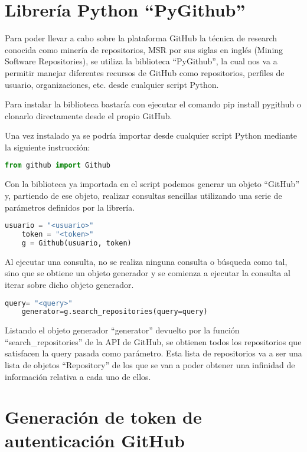 \section{Librería Python ``PyGithub''}

Para poder llevar a cabo sobre la plataforma GitHub la técnica de research conocida como minería de repositorios, MSR por sus siglas en inglés (Mining Software Repositories), se utiliza la biblioteca ``PyGithub'', la cual nos va a permitir manejar diferentes recursos de GitHub como repositorios, perfiles de usuario, organizaciones, etc. desde cualquier script Python.

Para instalar la biblioteca bastaría con ejecutar el comando pip install pygithub o clonarlo directamente desde el propio GitHub.

Una vez instalado ya se podría importar desde cualquier script Python mediante la siguiente instrucción:

\begin{lstlisting}[language=Python]
    from github import Github
\end{lstlisting}

Con la biblioteca ya importada en el script podemos generar un objeto ``GitHub'' y, partiendo de ese objeto, realizar consultas sencillas utilizando una serie de parámetros definidos por la librería.

\begin{lstlisting}[language=Python]
    usuario = "<usuario>" 
    token = "<token>"
    g = Github(usuario, token)
\end{lstlisting}

Al ejecutar una consulta, no se realiza ninguna consulta o búsqueda como tal, sino que se obtiene un objeto generador y se comienza a ejecutar la consulta al iterar sobre dicho objeto generador.

\begin{lstlisting}[language=Python]
    query= "<query>" 
    generator=g.search_repositories(query=query)
\end{lstlisting}



Listando el objeto generador ``generator'' devuelto por la función ``search\_repositories'' de la API de GitHub, se obtienen todos los repositorios que satisfacen la query pasada como parámetro. Esta lista de repositorios va a ser una lista de objetos “Repository” de los que se van a poder obtener una infinidad de información relativa a cada uno de ellos.

\section{Generación de token de autenticación GitHub}

